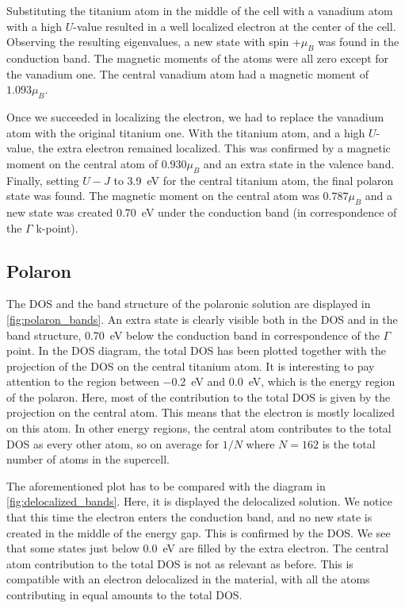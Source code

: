 Substituting the titanium atom in the middle of the cell with a vanadium atom with a high $U$-value resulted in a well localized electron at the center of the cell. Observing the resulting eigenvalues, a new state with spin +$\mu_B$ was found in the conduction band. The magnetic moments of the atoms were  all zero except for the vanadium one. The central vanadium atom had a magnetic moment of $1.093 \mu_B$.

Once we succeeded in localizing the electron, we had to replace the vanadium atom with the original titanium one. With the titanium atom, and a high $U$-value, the extra electron remained localized. This was confirmed by a magnetic moment on the central atom of $0.930 \mu_B$ and an extra state in the valence band. Finally, setting $U-J$ to \SI{3.9}{eV} for the central titanium atom, the final polaron state was found. The magnetic moment on the central atom was $0.787 \mu_B$ and a new state was created \SI{0.70}{eV} under the conduction band (in correspondence of the $\Gamma$ k-point).

\subsection{Polaron}

The DOS and the band structure of the polaronic solution are displayed in \cref{fig:polaron_bands}. An extra state is clearly visible both in the DOS and in the band structure, \SI{0.70}{eV} below the conduction band in correspondence of the $\Gamma$ point. In the DOS diagram, the total DOS has been plotted together with the projection of the DOS on the central titanium atom. It is interesting to pay attention to the region between \SI{-0.2}{eV} and \SI{0.0}{eV}, which is the energy region of the polaron. Here, most of the contribution to the total DOS is given by the projection on the central atom. This means that the electron is mostly localized on this atom. In other energy regions, the central atom contributes to the total DOS as every other atom, so on average for $1/N$ where $N = 162$ is the total number of atoms in the supercell.

The aforementioned plot has to be compared with the diagram in \cref{fig:delocalized_bands}. Here, it is displayed the delocalized solution. We notice that this time the electron enters the conduction band, and no new state is created in the middle of the energy gap. This is confirmed by the DOS. We see that some states just below \SI{0.0}{eV} are filled by the extra electron. The central atom contribution to the total DOS is not as relevant as before. This is compatible with an electron delocalized in the material, with all the atoms contributing in equal amounts to the total DOS.

